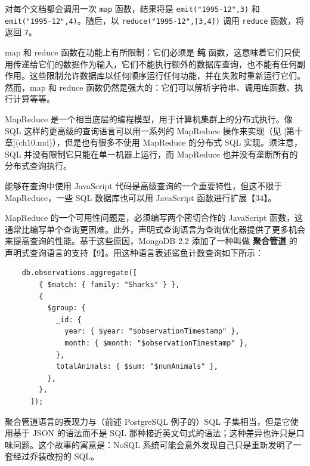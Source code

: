 对每个文档都会调用一次 \texttt{map} 函数，结果将是 \texttt{emit("1995-12",3)} 和 \texttt{emit("1995-12",4)}。随后，以 \texttt{reduce("1995-12",[3,4])} 调用 \texttt{reduce} 函数，将返回 \texttt{7}。

map 和 reduce 函数在功能上有所限制：它们必须是 \textbf{纯} 函数，这意味着它们只使用传递给它们的数据作为输入，它们不能执行额外的数据库查询，也不能有任何副作用。这些限制允许数据库以任何顺序运行任何功能，并在失败时重新运行它们。然而，map 和 reduce 函数仍然是强大的：它们可以解析字符串、调用库函数、执行计算等等。

MapReduce 是一个相当底层的编程模型，用于计算机集群上的分布式执行。像 SQL 这样的更高级的查询语言可以用一系列的 MapReduce 操作来实现（见 [第十章](ch10.md)），但是也有很多不使用 MapReduce 的分布式 SQL 实现。须注意，SQL 并没有限制它只能在单一机器上运行，而 MapReduce 也并没有垄断所有的分布式查询执行。

能够在查询中使用 JavaScript 代码是高级查询的一个重要特性，但这不限于 MapReduce，一些 SQL 数据库也可以用 JavaScript 函数进行扩展【34】。

MapReduce 的一个可用性问题是，必须编写两个密切合作的 JavaScript 函数，这通常比编写单个查询更困难。此外，声明式查询语言为查询优化器提供了更多机会来提高查询的性能。基于这些原因，MongoDB 2.2 添加了一种叫做 \textbf{聚合管道} 的声明式查询语言的支持【9】。用这种语言表述鲨鱼计数查询如下所示：

\begin{lstlisting}
    db.observations.aggregate([
        { $match: { family: "Sharks" } },
        {
          $group: {
            _id: {
              year: { $year: "$observationTimestamp" },
              month: { $month: "$observationTimestamp" },
            },
            totalAnimals: { $sum: "$numAnimals" },
          },
        },
      ]);
\end{lstlisting}

聚合管道语言的表现力与（前述 PostgreSQL 例子的）SQL 子集相当，但是它使用基于 JSON 的语法而不是 SQL 那种接近英文句式的语法；这种差异也许只是口味问题。这个故事的寓意是：NoSQL 系统可能会意外发现自己只是重新发明了一套经过乔装改扮的 SQL。